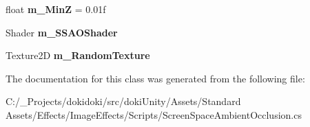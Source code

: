 \begin{DoxyCompactItemize}
\item 
float {\bfseries m\+\_\+\+MinZ} = 0.\+01f\hypertarget{class_unity_standard_assets_1_1_image_effects_1_1_screen_space_ambient_occlusion_aa148c5da8cd9252f23e90a7a7be8d7ef}{}\label{class_unity_standard_assets_1_1_image_effects_1_1_screen_space_ambient_occlusion_aa148c5da8cd9252f23e90a7a7be8d7ef}

\item 
Shader {\bfseries m\+\_\+\+S\+S\+A\+O\+Shader}\hypertarget{class_unity_standard_assets_1_1_image_effects_1_1_screen_space_ambient_occlusion_ae59c1f01ff257b1f1cdb6c1716eb1aa7}{}\label{class_unity_standard_assets_1_1_image_effects_1_1_screen_space_ambient_occlusion_ae59c1f01ff257b1f1cdb6c1716eb1aa7}

\item 
Texture2D {\bfseries m\+\_\+\+Random\+Texture}\hypertarget{class_unity_standard_assets_1_1_image_effects_1_1_screen_space_ambient_occlusion_a309e0c2af7c7feab406ddd22f6046832}{}\label{class_unity_standard_assets_1_1_image_effects_1_1_screen_space_ambient_occlusion_a309e0c2af7c7feab406ddd22f6046832}

\end{DoxyCompactItemize}


The documentation for this class was generated from the following file\+:\begin{DoxyCompactItemize}
\item 
C\+:/\+\_\+\+Projects/dokidoki/src/doki\+Unity/\+Assets/\+Standard Assets/\+Effects/\+Image\+Effects/\+Scripts/Screen\+Space\+Ambient\+Occlusion.\+cs\end{DoxyCompactItemize}
